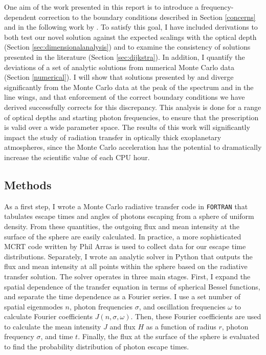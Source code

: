 \documentclass[onecolumn]{aastex63}
\begin{document}
One aim of the work presented in this report is to introduce a frequency-dependent correction to the boundary conditions described in Section \ref{concerns} and in the following work by \cite{2006ApJ...649...14D}. To satisfy this goal, I have included derivations to both test our novel solution against the expected scalings with the optical depth (Section \ref{sec:dimensionalanalysis}) and to examine the consistency of solutions presented in the literature (Section \ref{sec:dijkstra}). In addition, I quantify the deviations of a set of analytic solutions from numerical Monte Carlo data (Section \ref{numerical}). I will show that solutions presented by \cite{harrington1973} and \cite{2006ApJ...649...14D} diverge significantly from the Monte Carlo data at the peak of the spectrum and in the line wings, and that enforcement of the correct boundary conditions we have derived successfully corrects for this discrepancy. This analysis is done for a range of optical depths and starting photon frequencies, to ensure that the prescription is valid over a wide parameter space. The results of this work will significantly impact the study of radiation transfer in optically thick exoplanetary atmospheres, since the Monte Carlo acceleration has the potential to dramatically increase the scientific value of each CPU hour. 

\subsection{Methods}

As a first step, I wrote a Monte Carlo radiative transfer code in \texttt{FORTRAN} that tabulates escape times and angles of photons escaping from a sphere of uniform density. From these quantities, the outgoing flux and mean intensity at the surface of the sphere are easily calculated. In practice, a more sophisticated MCRT code written by Phil Arras is used to collect data for our escape time distributions. Separately, I wrote an analytic solver in Python that outputs the flux and mean intensity at all points within the sphere based on the radiative transfer solution. The solver operates in three main stages. First, I expand the spatial dependence of the transfer equation in terms of spherical Bessel functions, and separate the time dependence as a Fourier series. I use a set number of spatial eigenmodes $n$, photon frequencies $\sigma$, and oscillation frequencies $\omega$ to calculate Fourier coefficients $J(n, \sigma, \omega)$. Then, these Fourier coefficients are used to calculate the mean intensity $J$ and flux $H$ as a function of radius $r$, photon frequency $\sigma$, and time $t$. Finally, the flux at the surface of the sphere is evaluated to find the probability distribution of photon escape times.
\end{document}
